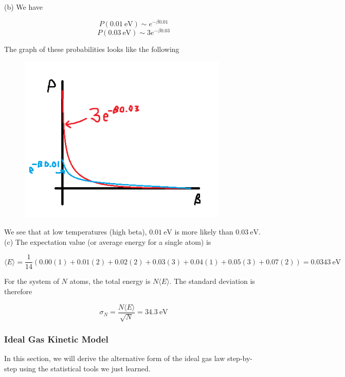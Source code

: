 \begin{texample}
	(b) We have
	
	\[ P(\SI{0.01}{\electronvolt}) \sim e^{-\beta 0.01} \]
	\[ P(\SI{0.03}{\electronvolt}) \sim 3e^{-\beta 0.03} \]
	
	The graph of these probabilities looks like the following
	
	\begin{figure}[H]
		\centering
		\includegraphics[width=100mm]{29.png}
	\end{figure}
	
	We see that at low temperatures (high beta), $\SI{0.01}{\electronvolt}$ is more likely than $\SI{0.03}{\electronvolt}$. \\
	
	(c) The expectation value (or average energy for a single atom) is
	
	\[ \langle E \rangle=\frac{1}{14} \left( 0.00 (1) + 0.01 (2) + 0.02 (2) + 0.03 (3) + 0.04 (1) + 0.05 (3) + 0.07 (2) \right) = \SI{0.0343}{\electronvolt} \]
	
	For the system of $N$ atoms, the total energy is $N\langle E \rangle$. The standard deviation is therefore
	
	\[ \sigma_N = \frac{N\langle E \rangle}{\sqrt{N}}=\SI{34.3}{\electronvolt} \]
	
\end{texample}

\subsubsection{Ideal Gas Kinetic Model}

In this section, we will derive the alternative form of the ideal gas law step-by-step using the statistical tools we just learned. \\

